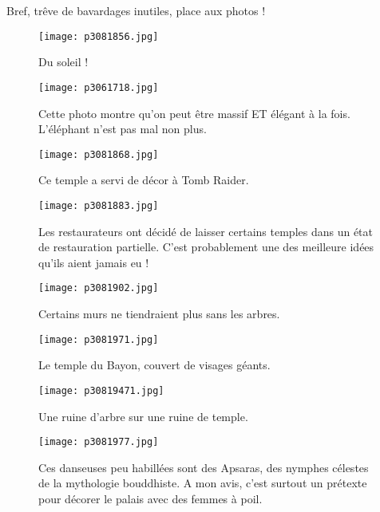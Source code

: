 \documentclass{book}
\begin{document}
Bref, trêve de bavardages inutiles, place aux photos !


\begin{figure}[h]
\centering
\texttt{[image: p3081856.jpg]}
\caption*{Du soleil !}
\end{figure}


\begin{figure}[h]
\centering
\texttt{[image: p3061718.jpg]}
\caption*{Cette photo montre qu'on peut être massif ET élégant à la fois. L'éléphant n'est pas mal non plus.}
\end{figure}


\begin{figure}[h]
\centering
\texttt{[image: p3081868.jpg]}
\caption*{Ce temple a servi de décor à Tomb Raider.}
\end{figure}


\begin{figure}[h]
\centering
\texttt{[image: p3081883.jpg]}
\caption*{Les restaurateurs ont décidé de laisser certains temples dans un état de restauration partielle. C'est probablement une des meilleure idées qu'ils aient jamais eu !}
\end{figure}


\begin{figure}[h]
\centering
\texttt{[image: p3081902.jpg]}
\caption*{Certains murs ne tiendraient plus sans les arbres.}
\end{figure}


\begin{figure}[h]
\centering
\texttt{[image: p3081971.jpg]}
\caption*{Le temple du Bayon, couvert de visages géants.}
\end{figure}


\begin{figure}[h]
\centering
\texttt{[image: p30819471.jpg]}
\caption*{Une ruine d'arbre sur une ruine de temple.}
\end{figure}


\begin{figure}[h]
\centering
\texttt{[image: p3081977.jpg]}
\caption*{Ces danseuses peu habillées sont des Apsaras, des nymphes célestes de la mythologie bouddhiste. A mon avis, c'est surtout un prétexte pour décorer le palais avec des femmes à poil.}
\end{figure}
\end{document}

